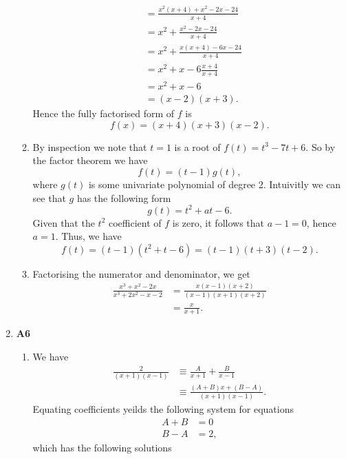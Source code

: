 \documentclass[12pt,oneside]{book}
\begin{document}
\begin{enumerate}
\begin{enumerate}
\begin{align*}
                &= \frac{x^2 (x + 4) + x^2 - 2x - 24}{x+4} \\
                &= x^2 + \frac{x^2 -2 x - 24}{x+4} \\
                &= x^2 + \frac{x(x + 4) -6x - 24}{x+ 4} \\
                &= x^2 + x - 6\frac{x+ 4}{x+4} \\
                &= x^2 + x - 6 \\
                &= (x - 2) (x + 3).
            \end{align*}
            Hence the fully factorised form of $f$ is \[
                f(x) = (x + 4)(x + 3)(x - 2)
            .\] 
            \item By inspection we note that $t = 1$ is a root of $f(t) = t^3 - 7t + 6$. So by the factor theorem we have \[
                f(t) = (t - 1) g(t)
            ,\] where $g(t)$ is some univariate polynomial of degree 2. Intuivitly we can see that $g$ has the following form \[
                g(t) = t^2 + at - 6
            .\]  Given that the $t^2$ coefficient of $f$ is zero, it follows that $a - 1 = 0$, hence $a = 1$. Thus, we have \[
                f(t) = (t - 1) (t^2 + t - 6) = (t-1) (t+3) (t-2)
            .\] 
            \item Factorising the numerator and denominator, we get \begin{align*}
                \frac{x^3 + x^2 - 2x}{x^3 + 2x^2 - x - 2} &= \frac{x(x - 1)(x + 2)}{(x - 1)(x + 1)(x + 2)} \\
                &= \frac{x}{x+1}.
            \end{align*}
        \end{enumerate}
        \item \textbf{A6} \begin{enumerate}
            \item We have \begin{align*}
                \frac{2}{(x+1)(x-1)} &\equiv \frac{A}{x+1} + \frac{B}{x-1} \\
                &\equiv \frac{(A+B)x + (B - A)}{(x+1)(x-1)}.
            \end{align*}
            Equating coefficients yeilds the following system for equations \begin{align*}
                A + B &= 0 \\
                B - A &= 2,
            \end{align*}
            which has the following solutions
            \begin{align*}

\end{align*}
\end{enumerate}
\end{enumerate}
\end{document}
